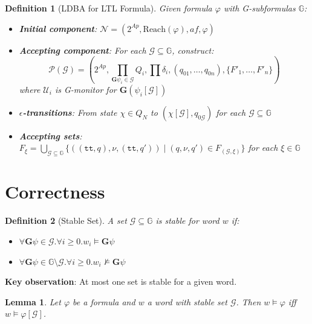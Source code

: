 \documentclass{article}
\newtheorem{definition}{Definition}
\newtheorem{lemma}{Lemma}
\begin{document}
\begin{definition}[LDBA for LTL Formula]
Given formula $\varphi$ with G-subformulas $\mathbb{G}$:

\begin{itemize}
    \item \textbf{Initial component}: $\mathcal{N} = (2^{Ap}, \text{Reach}(\varphi), af, \varphi)$

    \item \textbf{Accepting component}: For each $\mathcal{G} \subseteq \mathbb{G}$, construct:
    \begin{equation}
    \mathcal{P}(\mathcal{G}) = (2^{Ap}, \prod_{\mathbf{G}\psi_i \in \mathcal{G}} Q_i, \prod \delta_i, (q_{01}, \ldots, q_{0n}), \{F'_1, \ldots, F'_n\})
    \end{equation}
    where $\mathcal{U}_i$ is G-monitor for $\mathbf{G}(\psi_i[\mathcal{G}])$

    \item \textbf{$\epsilon$-transitions}: From state $\chi \in Q_N$ to $(\chi[\mathcal{G}], q_{0\mathcal{G}})$ for each $\mathcal{G} \subseteq \mathbb{G}$

    \item \textbf{Accepting sets}: $F_\xi = \bigcup_{\mathcal{G} \subseteq \mathbb{G}} \{((\mathtt{tt}, q), \nu, (\mathtt{tt}, q')) \mid (q, \nu, q') \in F_{(\mathcal{G}, \xi)}\}$ for each $\xi \in \mathbb{G}$
\end{itemize}
\end{definition}

\section{Correctness}

\begin{definition}[Stable Set]
A set $\mathcal{G} \subseteq \mathbb{G}$ is \emph{stable} for word $w$ if:
\begin{itemize}
    \item $\forall \mathbf{G}\psi \in \mathcal{G}. \forall i \geq 0. w_i \models \mathbf{G}\psi$
    \item $\forall \mathbf{G}\psi \in \mathbb{G} \setminus \mathcal{G}. \forall i \geq 0. w_i \not\models \mathbf{G}\psi$
\end{itemize}
\end{definition}

\textbf{Key observation}: At most one set is stable for a given word.

\begin{lemma}
Let $\varphi$ be a formula and $w$ a word with stable set $\mathcal{G}$. Then $w \models \varphi$ iff $w \models \varphi[\mathcal{G}]$.
\end{lemma}
\end{document}
